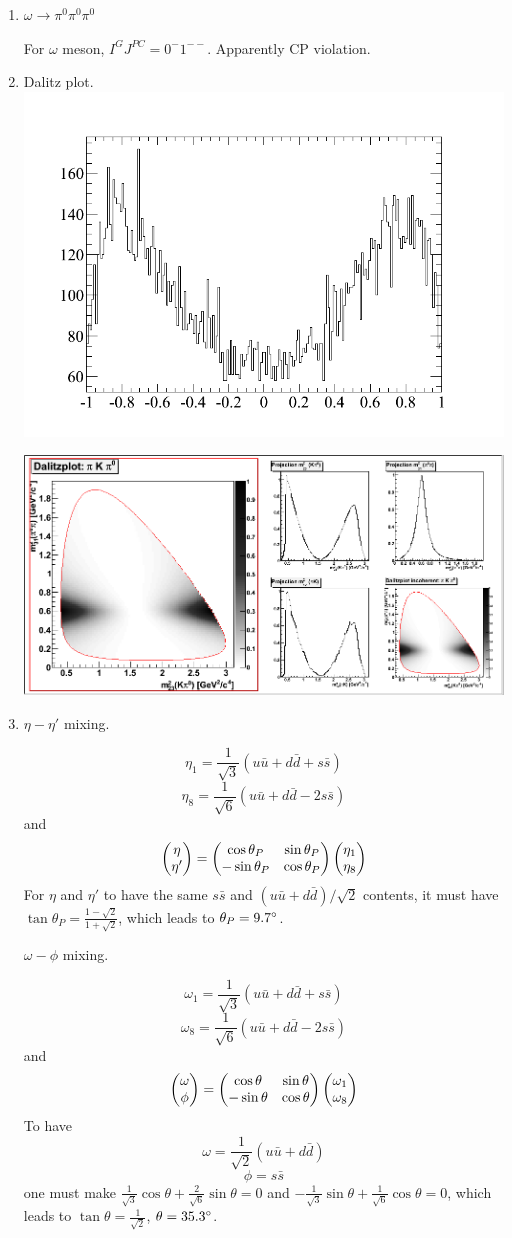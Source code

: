 \documentclass{article}
\begin{document}
\begin{enumerate}
	  \item $\omega\rightarrow\pi^0\pi^0\pi^0$

		For $\omega$ meson, $I^GJ^{PC}=0^-1^{--}$. Apparently CP violation.

    \item Dalitz plot.
    \includegraphics[width=4 in]{shenkeng.png}
    
    \includegraphics[width=4 in]{ss.png}
    \item $\eta-\eta'$ mixing.

    $$\eta_1=\frac{1}{\sqrt{3}}(u\bar u+d\bar d+s\bar s)$$
    $$\eta_8=\frac{1}{\sqrt{6}}(u\bar u+d\bar d-2s\bar s)$$
    and
    $$\pmqty{\eta\\\eta'}=\pmqty{\cos\theta_P&\sin\theta_P\\-\sin\theta_P&\cos\theta_P}\pmqty{\eta_1\\\eta_8}$$
    For $\eta$ and $\eta'$ to have the same $s\bar s$ and $(u\bar u+d\bar d)/\sqrt{2}$ contents, it must have $\tan\theta_P=\frac{1-\sqrt{2}}{1+\sqrt{2}}$, which leads to $\theta_P=9.7\degree$.

    $\omega-\phi$ mixing.

    $$\omega_1=\frac{1}{\sqrt{3}}(u\bar u+d\bar d+s\bar s)$$
    $$\omega_8=\frac{1}{\sqrt{6}}(u\bar u+d\bar d-2s\bar s)$$
    and
    $$\pmqty{\omega\\\phi}=\pmqty{\cos\theta&\sin\theta\\-\sin\theta&\cos\theta}\pmqty{\omega_1\\\omega_8}$$
    To have
    $$\omega=\frac{1}{\sqrt{2}}(u\bar u+d\bar d)$$
    $$\phi=s\bar s$$
    one must make $\frac{1}{\sqrt{3}}\cos\theta+\frac{2}{\sqrt{6}}\sin\theta=0$ and $-\frac{1}{\sqrt{3}}\sin\theta+\frac{1}{\sqrt{6}}\cos\theta=0$, which leads to $\tan\theta=\frac{1}{\sqrt{2}}$, $\theta=35.3\degree$.

\end{enumerate}
\end{document}

